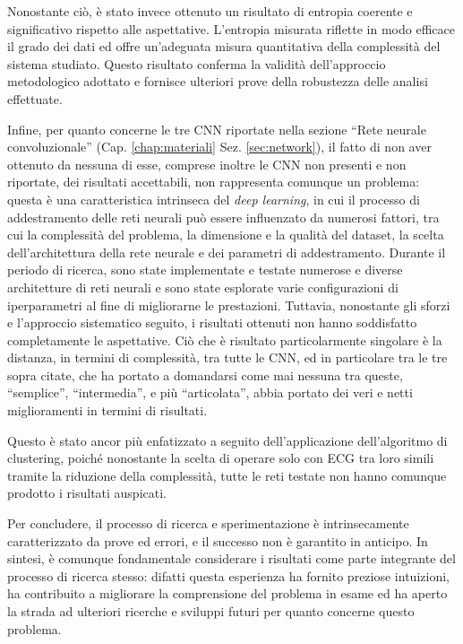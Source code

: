 \documentclass[12pt,italian]{report}
\begin{document}
Nonostante ciò, è stato invece ottenuto un risultato di entropia coerente e significativo rispetto alle aspettative. L'entropia misurata riflette in modo efficace il grado dei dati ed offre un'adeguata misura quantitativa della complessità del sistema studiato. Questo risultato conferma la validità dell'approccio metodologico adottato e fornisce ulteriori prove della robustezza delle analisi effettuate.

Infine, per quanto concerne le tre CNN riportate nella sezione ``Rete neurale convoluzionale'' (Cap. \ref{chap:materiali} Sez. \ref{sec:network}), il fatto di non aver ottenuto da nessuna di esse, comprese inoltre le CNN non presenti e non riportate, dei risultati accettabili, non rappresenta comunque un problema: questa è una caratteristica intrinseca del \textit{deep learning}, in cui il processo di addestramento delle reti neurali può essere influenzato da numerosi fattori, tra cui la complessità del problema, la dimensione e la qualità del dataset, la scelta dell'architettura della rete neurale e dei parametri di addestramento. Durante il periodo di ricerca, sono state implementate e testate numerose e diverse architetture di reti neurali e sono state esplorate varie configurazioni di iperparametri al fine di migliorarne le prestazioni. Tuttavia, nonostante gli sforzi e l'approccio sistematico seguito, i risultati ottenuti non hanno soddisfatto completamente le aspettative. Ciò che è risultato particolarmente singolare è la distanza, in termini di complessità, tra tutte le CNN, ed in particolare tra le tre sopra citate, che ha portato a domandarsi come mai nessuna tra queste, ``semplice'', ``intermedia'', e più ``articolata'', abbia portato dei veri e netti miglioramenti in termini di risultati.

Questo è stato ancor più enfatizzato a seguito dell'applicazione dell'algoritmo di clustering, poiché nonostante la scelta di operare solo con ECG tra loro simili tramite la riduzione della complessità, tutte le reti testate non hanno comunque prodotto i risultati auspicati.

Per concludere, il processo di ricerca e sperimentazione è intrinsecamente caratterizzato da prove ed errori, e il successo non è garantito in anticipo. In sintesi, è comunque fondamentale considerare i risultati come parte integrante del processo di ricerca stesso: difatti questa esperienza ha fornito preziose intuizioni, ha contribuito a migliorare la comprensione del problema in esame ed ha aperto la strada ad ulteriori ricerche e sviluppi futuri per quanto concerne questo problema.
\end{document}
